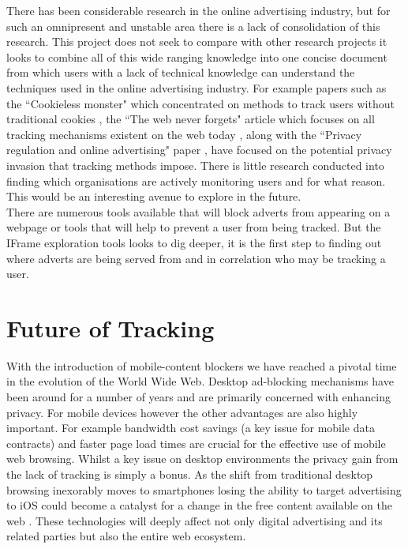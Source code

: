 \documentclass[12pt]{article}
\begin{document}
There has been considerable research in the online advertising industry, but for such an omnipresent and unstable area there is a lack of consolidation of this research. This project does not seek to compare with other research projects it looks to combine all of this wide ranging knowledge into one concise document from which users with a lack of technical knowledge can understand the techniques used in the online advertising industry. For example papers such as the ``Cookieless monster" which concentrated on methods to track users without traditional cookies \parencite{cookielessMonster}, the ``The web never forgets" article which focuses on all tracking mechanisms existent on the web today \parencite{webNeverForgets}, along with the ``Privacy regulation and online advertising" paper \parencite{goldfarb2011privacy}, have focused on the potential privacy invasion that tracking methods impose. There is little research conducted into finding which organisations are actively monitoring users and for what reason. This would be an interesting avenue to explore in the future.  \\

There are numerous tools available that will block adverts from appearing on a webpage or tools that will help to prevent a user from being tracked. But the IFrame exploration tools looks to dig deeper, it is the first step to finding out where adverts are being served from and in correlation who may be tracking a user. 

\pagebreak

\section{Future of Tracking} \label{futureTrack}
With the introduction of mobile-content blockers we have reached a pivotal time in the evolution of the World Wide Web. Desktop ad-blocking mechanisms have been around for a number of years and are primarily concerned with enhancing privacy. For mobile devices however the other advantages are also highly important. For example bandwidth cost savings (a key issue for mobile data contracts) and faster page load times are crucial for the effective use of mobile web browsing. Whilst a key issue on desktop environments the privacy gain from the lack of tracking is simply a bonus. As the shift from traditional desktop browsing inexorably moves to smartphones losing the ability to target advertising to iOS could become a catalyst for a change in the free content available on the web \parencite{tippingPoint}. These technologies will deeply affect not only digital advertising and its related parties but also the entire web ecosystem. \\
\end{document}
